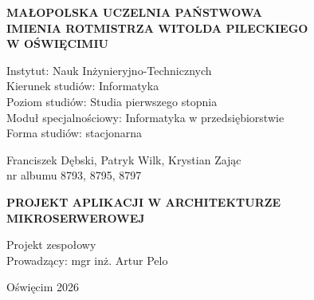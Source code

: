 \thispagestyle{empty}

\begin{center}
    \vspace*{-1cm} %
    
    {\Large\textbf{\selectfont
        MAŁOPOLSKA UCZELNIA PAŃSTWOWA \\
        IMIENIA ROTMISTRZA WITOLDA PILECKIEGO \\
        W OŚWIĘCIMIU} \\[2.5em]} %
        \vspace{0.5cm}
            \begin{flushleft}
                {\normalsize
                \hspace*{3cm} Instytut: Nauk Inżynieryjno-Technicznych \\[1em]
                \hspace*{3cm} Kierunek studiów: Informatyka \\[1em]
                \hspace*{3cm} Poziom studiów: Studia pierwszego stopnia \\[1em]
                \hspace*{3cm} Moduł specjalnościowy: Informatyka w przedsiębiorstwie \\[1em]
                \hspace*{3cm} Forma studiów: stacjonarna \\[1em]}
            \end{flushleft}
        
        \vspace{1cm}
    
    {\normalsize
    Franciszek Dębski, Patryk Wilk, Krystian Zając \\[1em]
    nr albumu 8793, 8795, 8797}
    
    \vspace{1cm}
    
    {\Large\textbf{\selectfont
    PROJEKT APLIKACJI W ARCHITEKTURZE MIKROSERWEROWEJ}}
    
    \vspace{3cm}
    
    \begin{center}
    {\normalsize
    \hspace*{11,5cm}Projekt zespołowy \\[0.5em]
    \hspace*{9cm}Prowadzący: mgr inż. Artur Pelo \\[0.5em]}
    \end{center}
    
    \vfill
    \vspace{3cm}
   
    {\normalsize
    Oświęcim 2026}
    
\end{center}

\newpage